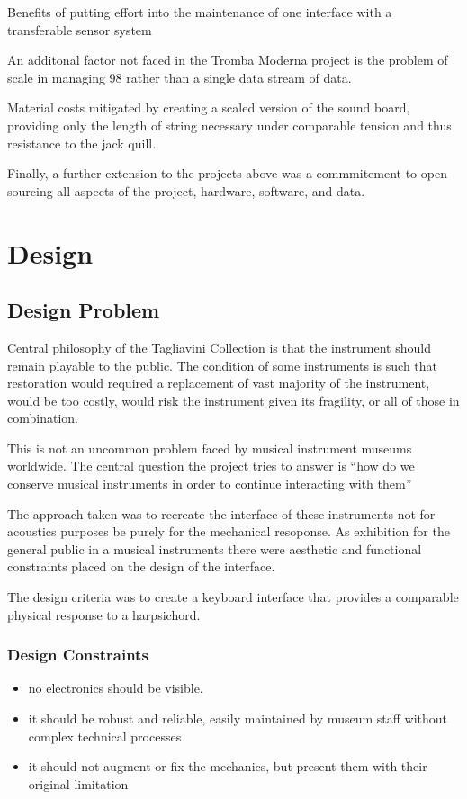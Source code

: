 Benefits of putting effort into the maintenance of one interface with a
transferable sensor system

An additonal factor not faced in the Tromba Moderna project is the
problem of scale in managing 98 rather than a single data stream of
data.

Material costs mitigated by creating a scaled version of the sound
board, providing only the length of string necessary under comparable
tension and thus resistance to the jack quill.

Finally, a further extension to the projects above was a commmitement to
open sourcing all aspects of the project, hardware, software, and data.

\section{Design}\label{design}

\subsection{Design Problem}\label{design-problem}

Central philosophy of the Tagliavini Collection is that the instrument
should remain playable to the public. The condition of some instruments
is such that restoration would required a replacement of vast majority
of the instrument, would be too costly, would risk the instrument given
its fragility, or all of those in combination.

This is not an uncommon problem faced by musical instrument museums
worldwide. The central question the project tries to answer is ``how do
we conserve musical instruments in order to continue interacting with
them''

The approach taken was to recreate the interface of these instruments
not for acoustics purposes be purely for the mechanical resoponse. As
exhibition for the general public in a musical instruments there were
aesthetic and functional constraints placed on the design of the
interface.

The design criteria was to create a keyboard interface that provides a
comparable physical response to a harpsichord.

\subsubsection{Design Constraints}\label{design-constraints}

\begin{itemize}
\item
  no electronics should be visible.
\item
  it should be robust and reliable, easily maintained by museum staff
  without complex technical processes
\item
  it should not augment or fix the mechanics, but present them with
  their original limitation
\end{itemize}

